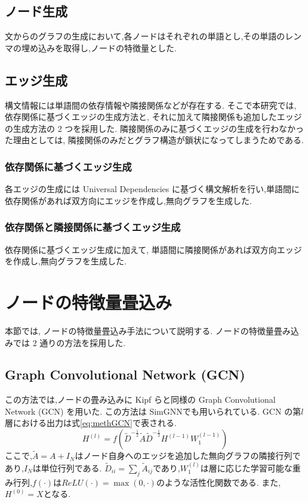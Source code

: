 \documentclass[a4j,twoside,12pt, dvipdfmx]{thesis} %
\begin{document}
\subsection{ノード生成}\label{meth:createNode}
文からのグラフの生成において,各ノードはそれぞれの単語とし,その単語のレンマの埋め込みを取得し,ノードの特徴量とした.

\subsection{エッジ生成}\label{meth:createEdge}
構文情報には単語間の依存情報や隣接関係などが存在する. そこで本研究では, 依存関係に基づくエッジの生成方法と, それに加えて隣接関係も追加したエッジの生成方法の 2 つを採用した.
隣接関係のみに基づくエッジの生成を行わなかった理由としては, 隣接関係のみだとグラフ構造が鎖状になってしまうためである.
\subsubsection*{依存関係に基づくエッジ生成}
各エッジの生成には Universal Dependencies に基づく構文解析を行い,単語間に依存関係があれば双方向にエッジを作成し,無向グラフを生成した.

\subsubsection*{依存関係と隣接関係に基づくエッジ生成}
依存関係に基づくエッジ生成に加えて, 単語間に隣接関係があれば双方向エッジを作成し,無向グラフを生成した.

\section{ノードの特徴量畳込み}\label{meth:convNode}
本節では, ノードの特徴量畳込み手法について説明する.
ノードの特徴量畳み込みでは 2 通りの方法を採用した.
\subsection{Graph Convolutional Network (GCN)}
この方法では,ノードの畳み込みに Kipf ら\cite{kipf2017semi}と同様の Graph Convolutional Network (GCN) を用いた.
この方法は SimGNN\cite{bai2019simgnn}でも用いられている.
GCN の第$l$層における出力は式\ref{eq:methGCN}で表される.
\begin{equation}
  \label{eq:methGCN}
  H^{(l)}=f(\tilde{D}^{-\frac{1}{2}}\tilde{A}\tilde{D}^{-\frac{1}{2}}H^{(l-1)}W_{1}^{(l-1)})
\end{equation}
ここで,$\tilde{A} = A + I_{N}$はノード自身へのエッジを追加した無向グラフの隣接行列であり,$I_N$は単位行列である.
$\tilde{D}_{ii} = \sum_{j} \tilde{A}_{ij}$であり,$W_{1}^{(l)}$は層に応じた学習可能な重み行列,$f(\cdot)$は$ReLU(\cdot) = \max (0, \cdot)$のような活性化関数である.
また,$H^{(0)}=X$となる.
\end{document}
